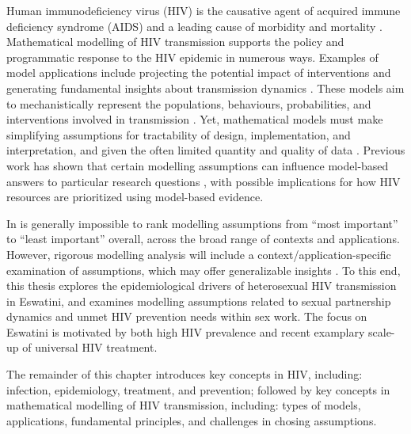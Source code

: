 Human immunodeficiency virus (HIV) is
the causative agent of acquired immune deficiency syndrome (AIDS)
and a leading cause of morbidity and mortality \cite{Maartens2014,GBD2019}.
Mathematical modelling of HIV transmission supports
the policy and programmatic response to the HIV epidemic in numerous ways.
Examples of model applications include
projecting the potential impact of interventions \cite{Eaton2012} and
generating fundamental insights about transmission dynamics \cite{Garnett1993}.
These models aim to mechanistically represent
the populations, behaviours, probabilities, and interventions
involved in transmission \cite{Garnett2011}.
Yet, mathematical models must make simplifying assumptions
for tractability of design, implementation, and interpretation,
and given the often limited quantity and quality of data \cite{Mishra2016,Garnett2011}.
Previous work has shown that certain modelling assumptions can influence
model-based answers to particular research questions
\cite{Garnett1993,Hontelez2013,Mishra2016,Johnson2016mf,Bernard2017,Knight2020},
with possible implications for how HIV resources are prioritized using model-based evidence.
\par
In is generally impossible to rank modelling assumptions
from ``most important'' to ``least important'' overall,
across the broad range of contexts and applications.
However, rigorous modelling analysis will include
a context/application-specific examination of assumptions,
which may offer generalizable insights \cite{Suen2017}.
To this end, this thesis explores
the epidemiological drivers of heterosexual HIV transmission in Eswatini,
and examines modelling assumptions related to
sexual partnership dynamics and unmet HIV prevention needs within sex work.
The focus on Eswatini is motivated by both high HIV prevalence
and recent examplary scale-up of universal HIV treatment.
\par
The remainder of this chapter introduces key concepts in HIV, including:
infection, epidemiology, treatment, and prevention;
followed by key concepts in mathematical modelling of HIV transmission, including:
types of models, applications, fundamental principles, and challenges in chosing assumptions.
\pagebreak %
